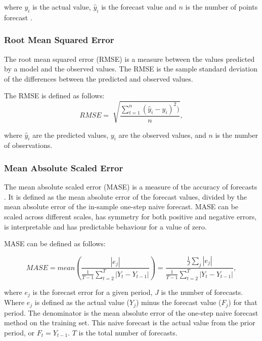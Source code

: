\noindent where $y_i$ is the actual value, $\hat{y}_i$ is the forecast value and $n$ is the number of points forecast \cite{Li2016}.

\subsubsection{Root Mean Squared Error}

The root mean squared error (RMSE) is a measure between the values predicted by a model and the observed values. The RMSE is the sample standard deviation of the differences between the predicted and observed values.

The RMSE is defined as follows:
\begin{equation}
RMSE = \sqrt[]{\frac{\sum_{t=1}^n(\hat{y}_i-y_i)^2)}{n}},
\end{equation}

\noindent where $\hat{y}_i$ are the predicted values, $y_i$ are the observed values, and $n$ is the number of observations.


\subsubsection{Mean Absolute Scaled Error}

The mean absolute scaled error (MASE) is a measure of the accuracy of forecasts \cite{Hyndman2006}. It is defined as the mean absolute error of the forecast values, divided by the mean absolute error of the in-sample one-step naive forecast. MASE can be scaled across different scales, has symmetry for both positive and negative errors, is interpretable and has predictable behaviour for a value of zero. 

MASE can be defined as follows:

\begin{equation}
MASE = mean\left(\frac{|e_j|}{\frac{1}{T-1}\sum_{t=2}^T|Y_t-Y_{t-1}|}\right)=\frac{\frac{1}{J}\sum_j|e_j|}{\frac{1}{T-1}\sum_{t=2}^{T}|Y_t-Y_{t-1}|},
\end{equation}

\noindent where $e_j$ is the forecast error for a given period, $J$ is the number of forecasts. Where $e_j$ is defined as the actual value ($Y_j$) minus the forecast value ($F_j$) for that period. The denominator is the mean absolute error of the one-step naive forecast method on the training set. This naive forecast is the actual value from the prior period, or $F_t=Y_{t-1}$. $T$ is the total number of forecasts.




















